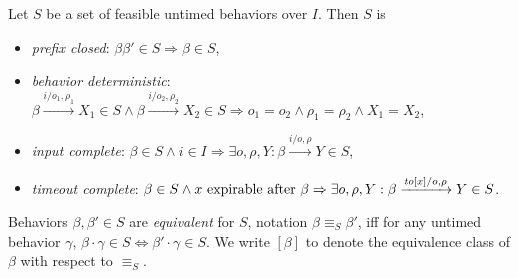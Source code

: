 \begin{definition}
Let $S$ be a set of feasible untimed behaviors over $I$. Then $S$ is
\begin{itemize}
\item
\emph{prefix closed}: $\beta \beta' \in S \Rightarrow \beta \in S$,
\item
\emph{behavior deterministic}:
$\beta \xrightarrow{i/o_1, \rho_1} X_1 \in S \wedge \beta \xrightarrow{i/o_2, \rho_2} X_2 \in S \Rightarrow o_1 = o_2 \wedge \rho_1 = \rho_2 \wedge X_1 = X_2$,
\item
\emph{input complete}:
$\beta \in S \wedge i \in I \Rightarrow \exists o, \rho, Y : \beta \xrightarrow{i/o, \rho} Y \in S$,
\item
\emph{timeout complete}:
$\beta \in S \wedge x \mbox{ expirable after } \beta \Rightarrow
\exists o, \rho, Y: \beta \xrightarrow{\mathit{to}[x]/o, \rho} Y \in S$.
\end{itemize}
Behaviors $\beta, \beta' \in S$ are \emph{equivalent} for $S$, notation $\beta \equiv_S \beta'$, iff 
for any untimed behavior
$\gamma$, $\beta \cdot \gamma \in S \Leftrightarrow \beta' \cdot \gamma \in S$.
We write $[\beta]$ to denote the equivalence class of $\beta$ with respect to $\equiv_S$.
\end{definition}

